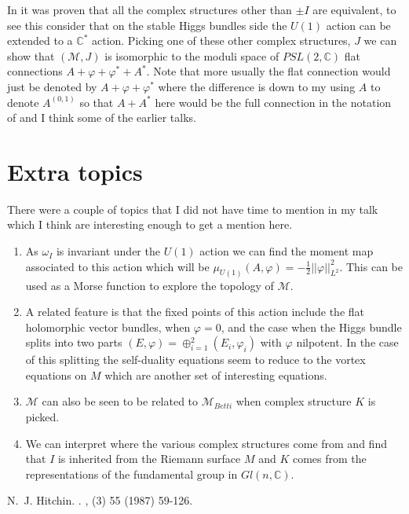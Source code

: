In \cite{Hitchin} it was proven that all the complex structures other than $\pm I$ are equivalent, to see this consider that on the stable Higgs bundles side the $U(1)$ action can be extended to a $\mathbb{C}^{*}$ action. Picking one of these other complex structures, $J$ we can show that  
$(\mathcal{M}, J) $ is isomorphic to the moduli space of $PSL(2,\mathbb{C})$ flat connections $A + \varphi + \varphi^* +A^{*} $. Note that more usually the flat connection would just be denoted by $A+\varphi+\varphi^{*}$ where the difference is down to my using $A$ to denote $A^{(0,1)}$ so that $A+A^{*}$ here would be the full connection in the notation of \cite{Hitchin} and I think some of the earlier talks.

\section{Extra topics}
There were a couple of topics that I did not have time to mention in my talk which I think are interesting enough to get a mention here.
\begin{enumerate}
\item As $\omega_{I}$ is invariant under the $U(1)$ action we can find the moment map associated to this action which will be $\mu_{U(1)}(A,\varphi)=-\frac{1}{2}||\varphi||_{L^{2}}^{2}$. This can be used as a Morse function to explore the topology of $\mathcal{M}$.

\item A related feature is that the fixed points of this action include the flat holomorphic vector bundles, when $\varphi=0$, and the case when the Higgs bundle splits into two parts $(E,\varphi)=\oplus_{i=1}^{2}(E_{i},\varphi_{i})$ with $\varphi$ nilpotent. In the case of this splitting the self-duality equations seem to reduce to the vortex equations on $M$ which are another set of interesting equations.

\item $\mathcal{M}$ can also be seen to be related to $\mathcal{M}_{Betti}$ when complex structure $K$ is picked.

\item We can interpret where the various complex structures come from and find that $I$ is inherited from the Riemann surface $M$ and $K$ comes from the representations of the fundamental group in $Gl(n,\mathbb{C})$.
\end{enumerate}


\begin{thebibliography}{100}
N.~J. {Hitchin}.
.
, (3) 55 (1987) 59-126.
\end{thebibliography}


 